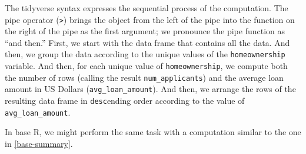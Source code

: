 \documentclass[12pt]{article}
\newenvironment{Shaded}{\begin{snugshade}}{\end{snugshade}}
\newcommand{\AttributeTok}[1]{\textcolor[rgb]{0.77,0.63,0.00}{#1}}
\newcommand{\ConstantTok}[1]{\textcolor[rgb]{0.00,0.00,0.00}{#1}}
\newcommand{\DecValTok}[1]{\textcolor[rgb]{0.00,0.00,0.81}{#1}}
\newcommand{\FunctionTok}[1]{\textcolor[rgb]{0.00,0.00,0.00}{#1}}
\newcommand{\NormalTok}[1]{#1}
\newcommand{\OtherTok}[1]{\textcolor[rgb]{0.56,0.35,0.01}{#1}}
\newcommand{\SpecialCharTok}[1]{\textcolor[rgb]{0.00,0.00,0.00}{#1}}
\newcommand{\StringTok}[1]{\textcolor[rgb]{0.31,0.60,0.02}{#1}}
\begin{document}

\label{tidy-summary} \linespread{2}
\vspace{3mm}\setlength{\parindent}{15pt}

The tidyverse syntax expresses the sequential process of the
computation. The pipe operator (\texttt{\textbar{}\textgreater{}})
brings the object from the left of the pipe into the function on the
right of the pipe as the first argument; we pronounce the pipe function
as ``and then.'' First, we start with the data frame that contains all
the data. And then, we group the data according to the unique values of
the \texttt{homeownership} variable. And then, for each unique value of
\texttt{homeownership}, we compute both the number of rows (calling the
result \texttt{num\_applicants}) and the average loan amount in US
Dollars (\texttt{avg\_loan\_amount}). And then, we arrange the rows of
the resulting data frame in \texttt{desc}ending order according to the
value of \texttt{avg\_loan\_amount}.

In base R, we might perform the same task with a computation similar to
the one in \ref{base-summary}.

\linespread{1}

\begin{Shaded}
\end{Shaded}
\end{document}
